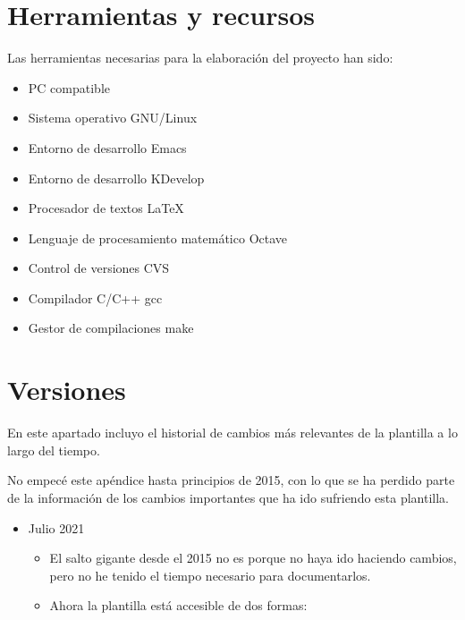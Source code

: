 \documentclass[spanish,openright]{book}
\begin{document}
\begin{appendices}
\chapter{Herramientas y recursos}
\label{cha:herr-y-recurs}

Las herramientas necesarias para la elaboración del proyecto han sido:

\begin{itemize}
\item PC compatible
\item Sistema operativo GNU/Linux \cite{gnulinux}
\item Entorno de desarrollo Emacs \cite{emacs}
\item Entorno de desarrollo KDevelop \cite{kdevelop}
\item Procesador de textos \LaTeX \cite{lamport94}
\item Lenguaje de procesamiento matemático Octave  \cite{octave}
\item Control de versiones CVS \cite{cvs}
\item Compilador C/C++ gcc \cite{gcc}
\item Gestor de compilaciones make \cite{make}
\end{itemize}






\chapter{Versiones}
\label{cha:versiones}

En este apartado incluyo el historial de cambios más relevantes de la
plantilla a lo largo del tiempo.

No empecé este apéndice hasta principios de 2015, con lo que se ha
perdido parte de la información de los cambios importantes que ha ido
sufriendo esta plantilla.


\begin{itemize}


\item Julio 2021
\begin{itemize}

\item El salto gigante desde el 2015 no es porque no haya ido
haciendo cambios, pero no he tenido el tiempo necesario para
documentarlos.

\item Ahora la plantilla está accesible de dos formas:
\begin{itemize}


\end{itemize}
\end{itemize}
\end{itemize}
\end{appendices}
\end{document}
